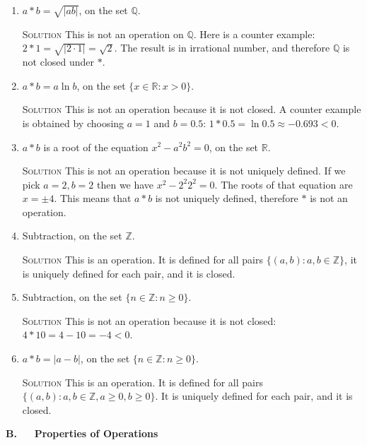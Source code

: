 \documentclass[twoside]{amsart}
\newcommand{\Rationals}{\mathbb{Q}{}}
\newcommand{\Reals}{\mathbb{R}{}}
\newcommand{\Integers}{\mathbb{Z}{}}
\newcommand{\Solution}{\textsc{Solution}\xspace}
\newcommand{\brk}{\vspace{5pt}}
\newcommand{\noindsol}{\noindent\Solution}
\begin{document}
\brk \begin{enumerate}[topsep=1ex,label=\protect{\textbf{\arabic*}},
  leftmargin=1em]

\item $a*b = \sqrt{|ab|}$, on the set $\Rationals$.

  \brk \noindsol This is not an operation on $\Rationals$. Here is a
  counter example: $2*1 = \sqrt{|2 \cdot 1|} = \sqrt{2}$. The result
  is in irrational number, and therefore $\Rationals$ is not closed
  under $*$.  \brk



\item $a*b = a \ln b$, on the set $\{x \in \Reals : x > 0\}$.

  \brk \noindsol This is not an operation because it is not closed. A
  counter example is obtained by choosing $a=1$ and $b=0.5$: $1 * 0.5
  = \ln 0.5 \approx -0.693 < 0$.  \brk



\item $a*b$ is a root of the equation $x^2 - a^2 b^2 = 0$, on the set
  $\Reals$.

  \brk \noindsol This is not an operation because it is not uniquely
  defined.  If we pick $a=2,b=2$ then we have $x^2 - 2^2 2^2 = 0$. The
  roots of that equation are $x = \pm 4$. This means that $a*b$ is not
  uniquely defined, therefore $*$ is not an operation.  \brk


\item Subtraction, on the set $\Integers$.

  \brk \noindsol This is an operation. It is defined for all pairs
  $\{(a,b) : a,b \in \Integers\}$, it is uniquely defined for each
  pair, and it is closed.  \brk


\item Subtraction, on the set $\{ n \in \Integers : n \ge 0\}$.

  \brk \noindsol This is not an operation because it is not closed:
  $4*10 = 4 - 10 = -4 < 0$. \brk

\item $a * b = |a-b|$, on the set $\{ n \in \Integers : n \ge 0\}$.

  \brk \noindsol This is an operation. It is defined for all pairs
  $\{(a,b) : a,b \in \Integers, a \ge 0, b \ge 0\}$. It is uniquely
  defined for each pair, and it is closed.

\end{enumerate}

\noindent\large\textbf{B. $\quad$ Properties of Operations} 
\end{document}
